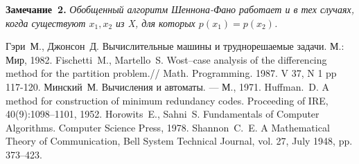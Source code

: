 \documentclass{spisok-article}
\begin{document}
\noindent
\hbox{\bf Замечание 2.}
{\it Обобщенный алгоритм Шеннона-Фано работает и в тех случаях, когда существуют $x_1, x_2$ из X, для которых $p(x_1) = p(x_2)$. }
%
%
\makeatletter\renewcommand{\refname}{\intl@references}\makeatother
\begin{thebibliography}{8}
%
\bibitem{}
Гэри~М., Джонсон~Д. Вычислительные машины и труднорешаемые задачи. М.: Мир, 1982.
\bibitem{}
Fischetti~M., Martello~S. Wost--case analysis of the differencing method for the partition problem.// Math. Programming. 1987. V 37, N 1 pp 117-120.
\bibitem{}
Минский~М. Вычисления и автоматы. --- М., 1971.
\bibitem{}
Huffman.~D. A method for construction of minimum redundancy codes. Proceeding of IRE, 40(9):1098--1101, 1952.
\bibitem{}
Horowits~E., Sahni~S. Fundamentals of Computer Algorithms. Computer Science Press, 1978.
\bibitem{}
Shannon~C.~E. A Mathematical Theory of Communication, Bell System Technical Journal, vol. 27, July 1948, pp. 373--423.

\end{thebibliography}
\end{document}
